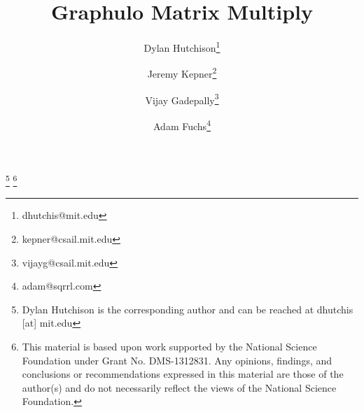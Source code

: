 \documentclass[conference]{IEEEtran}
\begin{document}
\title{Graphulo Matrix Multiply}



\author[*]{Dylan Hutchison\thanks{dhutchis@mit.edu}}
\author[*]{Jeremy Kepner\thanks{kepner@csail.mit.edu}}
\author[*]{Vijay Gadepally\thanks{vijayg@csail.mit.edu}}
\author[$\dagger$]{Adam Fuchs\thanks{adam@sqrrl.com}}

\renewcommand\Authands{, }

%

\maketitle

{\let\thefootnote\relax\footnote{Dylan Hutchison is the corresponding
    author and can be reached at dhutchis [at] mit.edu
}}
{\let\thefootnote\relax\footnote{This material is based upon work
    supported by the National Science Foundation under Grant
    No. DMS-1312831. Any opinions, findings, and conclusions or recommendations expressed in this material are those of the author(s) and do not necessarily reflect the views of the National Science Foundation.
}}
\end{document}
